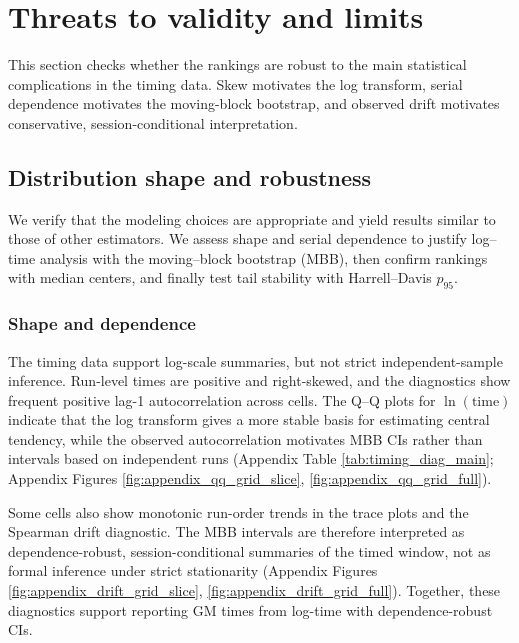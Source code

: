 \documentclass[nomenclature, english, bibtex]{kththesis}
\numberwithin{listing}{chapter}
\begin{document}
\section{Threats to validity and limits}
\label{sec:threats-validity}
This section checks whether the rankings are robust to the main statistical complications in the timing data. Skew motivates the log transform, serial dependence motivates the moving-block bootstrap, and observed drift motivates conservative, session-conditional interpretation.

\subsection{Distribution shape and robustness}
We verify that the modeling choices are appropriate and yield results similar to those of other estimators. We assess shape and serial dependence to justify log–time analysis with the moving–block bootstrap (\gls{MBB}), then confirm rankings with median centers, and finally test tail stability with Harrell–Davis $p_{95}$.

\subsubsection{Shape and dependence}
The timing data support log-scale summaries, but not strict independent-sample inference. Run-level times are positive and right-skewed, and the diagnostics show frequent positive lag-1 autocorrelation across cells. The Q--Q plots for \(\ln(\text{time})\) indicate that the log transform gives a more stable basis for estimating central tendency, while the observed autocorrelation motivates \gls{MBB} \glspl{CI} rather than intervals based on independent runs (Appendix Table \ref{tab:timing_diag_main}; Appendix Figures \ref{fig:appendix_qq_grid_slice}, \ref{fig:appendix_qq_grid_full}).

Some cells also show monotonic run-order trends in the trace plots and the Spearman drift diagnostic. The \gls{MBB} intervals are therefore interpreted as dependence-robust, session-conditional summaries of the timed window, not as formal inference under strict stationarity (Appendix Figures \ref{fig:appendix_drift_grid_slice}, \ref{fig:appendix_drift_grid_full}). Together, these diagnostics support reporting \gls{GM} times from log-time with dependence-robust \glspl{CI}.
\end{document}
